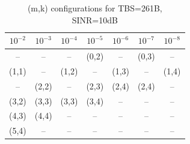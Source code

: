 \begin{table}[ht]
\centering
\caption{(m,k) configurations for TBS=261B, SINR=10dB}
\label{tab:conf_{261B_10dB}}
\begin{tabular}{ccccccc}
\hline
$10^{-2}$ & $10^{-3}$ & $10^{-4}$ & $10^{-5}$ & $10^{-6}$ & $10^{-7}$ & $10^{-8}$ \\ \hline
-- & -- & -- & (0,2) & -- & (0,3) & -- \\
(1,1) & -- & (1,2) & -- & (1,3) & -- & (1,4) \\
-- & (2,2) & -- & (2,3) & (2,4) & (2,4) & -- \\
(3,2) & (3,3) & (3,3) & (3,4) & -- & -- & -- \\
(4,3) & (4,4) & -- & -- & -- & -- & -- \\
(5,4) & -- & -- & -- & -- & -- & -- \\
\hline
\end{tabular}
\end{table}